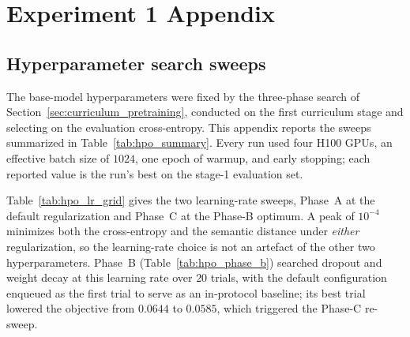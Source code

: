 \documentclass[titlepage,a4paper,11pt]{report}
\begin{document}
\section{Experiment 1 Appendix}
    \subsection{Hyperparameter search sweeps}\label{app:hpo}
    The base-model hyperparameters were fixed by the three-phase search of Section~\ref{sec:curriculum_pretraining}, conducted on the first curriculum stage and selecting on the evaluation cross-entropy. This appendix reports the sweeps summarized in Table~\ref{tab:hpo_summary}. Every run used four \textsc{H100} GPUs, an effective batch size of $1024$, one epoch of warmup, and early stopping; each reported value is the run's best on the stage-1 evaluation set.
    
    Table~\ref{tab:hpo_lr_grid} gives the two learning-rate sweeps, Phase~A at the default regularization and Phase~C at the Phase-B optimum. A peak of $10^{-4}$ minimizes both the cross-entropy and the semantic distance under \emph{either} regularization, so the learning-rate choice is not an artefact of the other two hyperparameters. Phase~B (Table~\ref{tab:hpo_phase_b}) searched dropout and weight decay at this learning rate over $20$ trials, with the default configuration enqueued as the first trial to serve as an in-protocol baseline; its best trial lowered the objective from $0.0644$ to $0.0585$, which triggered the Phase-C re-sweep.
\end{document}

